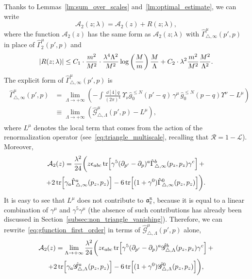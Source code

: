 \documentclass[a4paper, 11pt]{article}
\newcommand{\gyr}{\mathfrak{a}}								%
\newcommand{\rgyr}{\gyr_\textsc{z}^\textsc{r}}
\newcommand{\cutoff}{\Lambda}								%
\newcommand{\sing}[2]{{#1}^{#2}}							%
\newcommand{\loc}{\mathcal{L}}								%
\newcommand{\ren}{\mathcal{R}}								%
\theoremstyle{thm}
\begin{document}
Thanks to Lemmas~\ref{lm:sum_over_scales} and~\ref{lm:optimal_estimate}, we can write 
\begin{equation}
\label{eq:A_2_decomposition}
\mathcal{A}_2(z; \lambda) = \mathcal{A}_2(z) + R(z; \lambda),
\end{equation} 
where the function $\mathcal{A}_2(z)$ has the same form as $\mathcal{A}_2(z; \lambda)$ with $\hat{\Gamma}^\mu_{\triangle, \infty}(p', p)$ in place of $\hat{\Gamma}^\mu_2(p', p)$ and
\begin{equation}
\label{eq:R_estimate_A_2}
\abs{R(z; \lambda)} \le C_1 \cdot \frac{m^2}{M^2} \cdot \frac{\lambda^4 \cutoff^2}{M^2} \log \left( \frac{M}{m} \right) \frac{M}{\cutoff} + C_2 \cdot \lambda^2 \frac{m^2}{M^2} \frac{M^2}{\cutoff^2}.
\end{equation}
The explicit form of $\hat{\Gamma}^\mu_{\triangle, \infty}(p', p)$ is
\begin{align}
\label{eq:lambda_independent_triangle_limit}
\begin{split}
\hat{\Gamma}^\mu_{\triangle, \infty}(p', p) 
& = \lim_{\cutoff \to +\infty} \left(- \int \frac{\dd[4]{q}}{(2\pi)^4} \, \Upsilon_\nu \sing{\hat{g}}{\le N}_0(p' - q) \, \gamma^\mu \, \sing{\hat{g}}{\le N}_0(p - q) \Upsilon^\nu - L^\mu \right) \\
& \equiv \lim_{\cutoff \to +\infty} ( \hat{\mathscr{G}}^\mu_{\triangle, \cutoff}(p', p) - L^\mu),
\end{split}
\end{align}
where $L^\mu$ denotes the local term that comes from the action of the renormalization operator (see~\eqref{eq:triangle_multiscale}, recalling that $\ren = 1 - \loc$). Moreover,
\begin{multline}
\label{eq:gfunction_first_order}
\mathcal{A}_2(z) = \frac{\lambda^2}{24} \biggl( z \epsilon_{a b c} \tr[\gamma^5 (\partial_{p'} - \partial_p)^a \hat{\Gamma}^b_{\triangle, \infty}(p_z, p_z) \gamma^c]\, + \\
+ 2 \tr[\gamma_a \hat{\Gamma}^a_{\triangle, \infty}(p_z, p_z)] - 6 \tr[(1 + \gamma^0) \hat{\Gamma}^0_{\triangle, \infty}(p_z, p_z)] \biggr).
\end{multline}
It is easy to see that $L^\mu$ does not contribute to $\rgyr$, because it is equal to a linear combination of $\gamma^\mu$ and $\gamma^5 \gamma^\mu$ (the absence of such contributions has already been discussed in Section~\ref{subsec:non_triangle_vanishing}). Therefore, we can rewrite~\eqref{eq:gfunction_first_order} in terms of $\hat{\mathscr{G}}^\mu_{\triangle, \cutoff}(p', p)$ alone,
\begin{multline}
\label{eq:gfunction_first_order_no_local_part}
\mathcal{A}_2(z) = \lim_{\cutoff \to +\infty} \frac{\lambda^2}{24} \biggl( z \epsilon_{a b c} \tr[\gamma^5 (\partial_{p'} - \partial_p)^a \hat{\mathscr{G}}^b_{\triangle, \cutoff}(p_z, p_z) \gamma^c]\, + \\
+ 2 \tr[\gamma_a \hat{\mathscr{G}}^a_{\triangle, \cutoff}(p_z, p_z)] - 6 \tr[(1 + \gamma^0) \hat{\mathscr{G}}^0_{\triangle, \cutoff}(p_z, p_z)] \biggr),
\end{multline}
\end{document}

